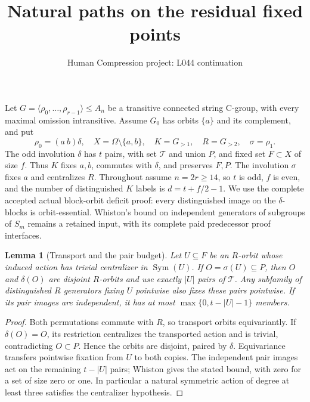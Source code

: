 \documentclass[10pt,a4paper]{article}
\title{Natural paths on the residual fixed points}
\author{Human Compression project: L044 continuation}
\date{}
\newtheorem{lemma}{Lemma}
\newcommand{\gen}[1]{\langle#1\rangle}
\begin{document}
\maketitle
Let $G=\gen{\rho_0,\ldots,\rho_{r-1}}\leq A_n$ be a transitive
connected string C-group, with every maximal omission intransitive.
Assume $G_0$ has orbits $\{a\}$ and its complement, and put
\[
 \rho_0=(a\ b)\delta,\quad X=\Omega\setminus\{a,b\},\quad
 K=G_{>1},\quad R=G_{>2},\quad \sigma=\rho_1.
\]
The odd involution $\delta$ has $t$ pairs, with set $\mathcal T$
and union $P$, and fixed set $F\subset X$ of size $f$.
Thus $K$ fixes $a,b$, commutes with $\delta$, and preserves $F,P$.
The involution $\sigma$ fixes $a$ and centralizes $R$.
Throughout assume $n=2r\geq14$, so $t$ is odd, $f$ is even, and
the number of distinguished $K$ labels is $d=t+f/2-1$.
We use the complete accepted actual block-orbit deficit proof:
every distinguished image on the $\delta$-blocks is orbit-essential.
Whiston's bound on independent generators of subgroups of $S_m$
remains a retained input, with its complete paid predecessor proof interfaces.

\begin{lemma}[Transport and the pair budget]\label{transport}
Let $U\subseteq F$ be an $R$-orbit whose induced action has trivial
centralizer in $\operatorname{Sym}(U)$. If $O=\sigma(U)\subseteq P$,
then $O$ and $\delta(O)$ are disjoint $R$-orbits and use exactly
$|U|$ pairs of $\mathcal T$. Any subfamily of distinguished $R$
generators fixing $U$ pointwise also fixes these pairs pointwise.
If its pair images are independent, it has at most
$\max\{0,t-|U|-1\}$ members.
\end{lemma}
\begin{proof}
Both permutations commute with $R$, so transport orbits equivariantly.
If $\delta(O)=O$, its restriction centralizes the transported action
and is trivial, contradicting $O\subset P$. Hence the orbits are
disjoint, paired by $\delta$. Equivariance transfers pointwise fixation
from $U$ to both copies. The independent pair images act on the remaining
$t-|U|$ pairs; Whiston gives the stated bound, with zero for a set
of size zero or one. In particular a natural symmetric action of
degree at least three satisfies the centralizer hypothesis.
\end{proof}
\end{document}
